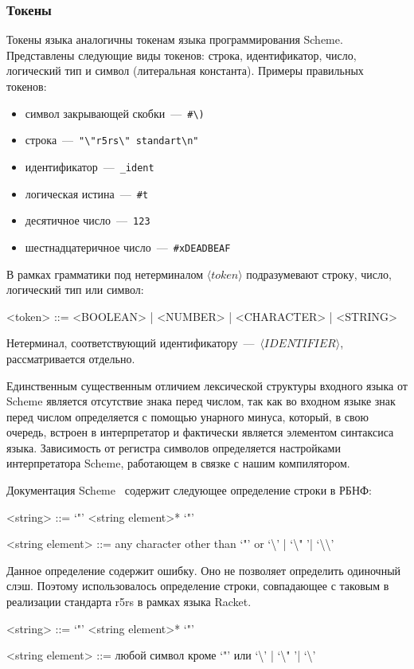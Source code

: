 \documentclass[12pt,a4paper,oneside]{extarticle}
\begin{document}
        \subsubsection{Токены}
            Токены языка аналогичны токенам языка программирования Scheme.
            Представлены следующие виды токенов: строка, идентификатор, число, логический тип и символ (литеральная константа). Примеры правильных токенов: 

            \begin{itemize}
                \item символ закрывающей скобки~---~\lstinline$#\)$
                \item строка~---~\lstinline$"\"r5rs\" standart\n"$
                \item идентификатор~---~\lstinline$_ident$
                \item логическая истина~---~\lstinline$#t$
                \item десятичное число~---~\lstinline$123$
                \item шестнадцатеричное число~---~\lstinline$#xDEADBEAF$
            \end{itemize}

            В рамках грамматики под нетерминалом $\langle token\rangle$ подразумевают строку, число, логический тип или символ:
            \begin{grammar}
                <token> ::= <BOOLEAN> | <NUMBER> | <CHARACTER> | <STRING>
            \end{grammar}
            Нетерминал, соответствующий идентификатору~---~$\langle IDENTIFIER \rangle$, рассматривается отдельно.

            Единственным существенным отличием лексической структуры входного языка от Scheme является отсутствие знака перед числом, так как во входном языке знак перед числом определяется с помощью унарного минуса, который, в свою очередь, встроен в интерпретатор и фактически является элементом синтаксиса языка.
            Зависимость от регистра символов определяется настройками интерпретатора Scheme, работающем в связке с нашим компилятором.            

            Документация Sсheme~\cite{r5rs} содержит следующее определение строки в РБНФ:
            \begin{grammar}
                <string> ::= `"' <string element>* `"'

                <string element> ::= any character other than `"' or `\textbackslash' | `\textbackslash " '| `\textbackslash \textbackslash'
            \end{grammar}
            Данное определение содержит ошибку.
            Оно не позволяет определить одиночный слэш.
            Поэтому использовалось определение строки, совпадающее с таковым в реализации стандарта r5rs в рамках языка Racket. 
            \begin{grammar}
                <string> ::= `"' <string element>* `"'

                <string element> ::= любой символ кроме `"' или `\textbackslash' | `\textbackslash " '| `\textbackslash'
            \end{grammar}
\end{document}
